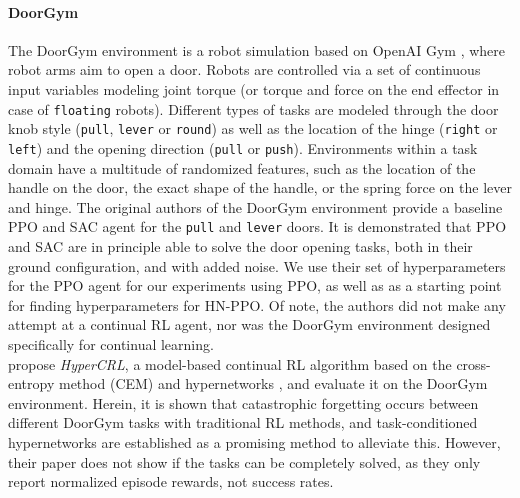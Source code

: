 \documentclass[dvipsnames]{article} %
\newcommand{\comment}[1]{{#1}}
\newcommand{\sa}[1] {\comment{{\color{cyan} SA: #1}}}                %
\newcommand{\commentOLD}[1]{}
\newcommand{\saOLD}[1] {\commentOLD{{\color{cyan} SA: #1}}}                %
\newcommand{\asOLD}[1] {\commentOLD{{\color{orange} AS: #1}}}              %
\begin{document}
\saOLD{I'm not sure we need to write about LwF. But in any case, it will be beneficial to include an overview of continual RL methods (or those specifically applied to robotics). Check this paper for a review of such methods: \url{https://arxiv.org/pdf/2012.13490.pdf}. I also think that we need a little more content here.}

\paragraph{DoorGym} %
The DoorGym environment \citep{doorgym} is a robot simulation based on OpenAI Gym \citep{gym}, where robot arms aim to open a door. Robots are controlled via a set of continuous input variables modeling joint torque (or torque and force on the end effector in case of \texttt{floating} robots). Different types of tasks are modeled through the door knob style (\texttt{pull}, \texttt{lever} or \texttt{round}) as well as the location of the hinge (\texttt{right} or \texttt{left}) and the opening direction (\texttt{pull} or \texttt{push}). Environments within a task domain have a multitude of randomized features, such as the location of the handle on the door, the exact shape of the handle, or the spring force on the lever and hinge.
The original authors of the DoorGym environment \citep{doorgym} provide a baseline PPO and SAC agent for the \texttt{pull} and \texttt{lever} doors. It is demonstrated that PPO and SAC are in principle able to solve the door opening tasks, both in their ground configuration, and with added noise. We use their set of hyperparameters for the PPO agent for our experiments using PPO, as well as as a starting point for finding hyperparameters for HN-PPO. Of note, the authors did not make any attempt at a continual RL agent, nor was the DoorGym environment designed specifically for continual learning.\\
\citet{MBRLHypernetworks} propose \textit{HyperCRL}, a model-based continual RL algorithm based on the cross-entropy method (CEM) \citep{rubinstein1997optimization} and hypernetworks \citep{CLHypernetworks}, and evaluate it on the DoorGym environment. Herein, it is shown that catastrophic forgetting occurs between different DoorGym tasks with traditional RL methods, and task-conditioned hypernetworks are established as a promising method to alleviate this. However, their paper does not show if the tasks can be completely solved, as they only report normalized episode rewards, not success rates.
\end{document}

